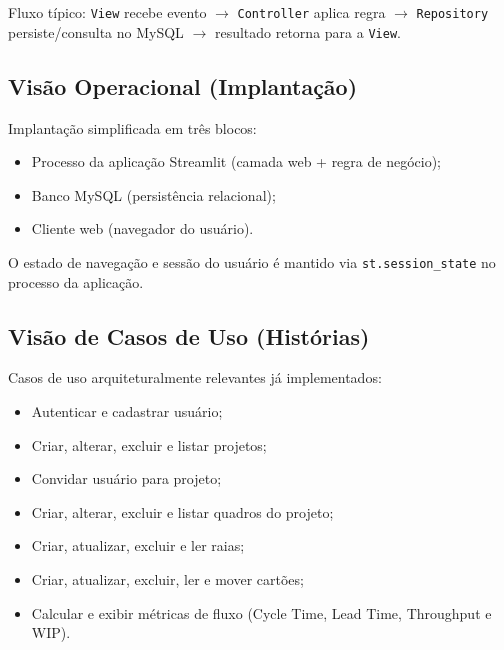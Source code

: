 Fluxo típico: \texttt{View} recebe evento $\rightarrow$ \texttt{Controller} aplica regra $\rightarrow$ \texttt{Repository} persiste/consulta no MySQL $\rightarrow$ resultado retorna para a \texttt{View}.

\subsection{Visão Operacional (Implantação)}
Implantação simplificada em três blocos:
\begin{itemize}
    \item Processo da aplicação Streamlit (camada web + regra de negócio);
    \item Banco MySQL (persistência relacional);
    \item Cliente web (navegador do usuário).
\end{itemize}
O estado de navegação e sessão do usuário é mantido via \texttt{st.session\_state} no processo da aplicação.

\subsection{Visão de Casos de Uso (Histórias)}
Casos de uso arquiteturalmente relevantes já implementados:
\begin{itemize}
    \item Autenticar e cadastrar usuário;
    \item Criar, alterar, excluir e listar projetos;
    \item Convidar usuário para projeto;
    \item Criar, alterar, excluir e listar quadros do projeto;
    \item Criar, atualizar, excluir e ler raias;
    \item Criar, atualizar, excluir, ler e mover cartões;
    \item Calcular e exibir métricas de fluxo (Cycle Time, Lead Time, Throughput e WIP).
\end{itemize}
